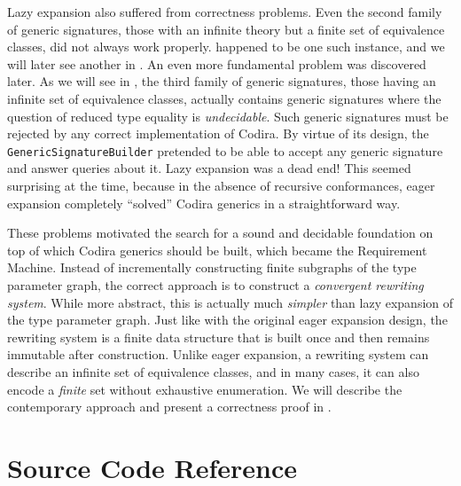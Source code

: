 \documentclass[../generics]{subfiles}
\begin{document}
Lazy expansion also suffered from correctness problems. Even the second family of generic signatures, those with an infinite theory but a finite set of equivalence classes, did not always work properly.  happened to be one such instance, and we will later see another in . An even more fundamental problem was discovered later. As we will see in , the third family of generic signatures, those having an infinite set of equivalence classes, actually contains generic signatures where the question of reduced type equality is \emph{undecidable}. Such generic signatures must be rejected by any correct implementation of Codira. By virtue of its design, the \texttt{GenericSignatureBuilder} pretended to be able to accept any generic signature and answer queries about it. Lazy expansion was a dead end! This seemed surprising at the time, because in the absence of recursive conformances, eager expansion completely ``solved'' Codira generics in a straightforward way.

These problems motivated the search for a sound and decidable foundation on top of which Codira generics should be built, which became the Requirement Machine. Instead of incrementally constructing finite subgraphs of the type parameter graph, the correct approach is to construct a \emph{convergent rewriting system}. While more abstract, this is actually much \emph{simpler} than lazy expansion of the type parameter graph. Just like with the original eager expansion design, the rewriting system is a finite data structure that is built once and then remains immutable after construction. Unlike eager expansion, a rewriting system can describe an infinite set of equivalence classes, and in many cases, it can also encode a \emph{finite} set without exhaustive enumeration. We will describe the contemporary approach and present a correctness proof in .



\section{Source Code Reference}
\end{document}
